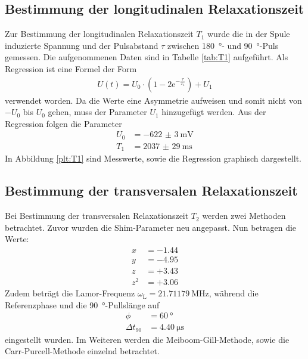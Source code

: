 \subsection{Bestimmung der longitudinalen Relaxationszeit}
Zur Bestimmung der longitudinalen Relaxationszeit $T_1$ wurde die in der
Spule induzierte Spannung und der Pulsabstand $\tau$ zwischen \SI{180}{\degree}-
und \SI{90}{\degree}-Puls gemessen. Die aufgenommenen Daten sind in Tabelle
\ref{tab:T1} aufgeführt.
%
\FloatBarrier
Als Regression ist eine Formel der Form
\begin{align*}
  U(t) = U_0 \cdot \left(1- 2\text{e}^{-\frac{\tau}{T_1}}\right) + U_1
\end{align*}
verwendet worden. Da die Werte eine Asymmetrie aufweisen und somit nicht von
$-U_0$ bis $U_0$ gehen, muss der Parameter $U_1$ hinzugefügt werden.
Aus der Regression folgen die Parameter
\begin{align*}
  U_0 &= -\SI{622(3)}{\milli\volt} \\
  T_1 &= \SI{2037(29)}{\milli\second}
\end{align*}
In Abbildung \ref{plt:T1} sind Messwerte, sowie die Regression graphisch dargestellt.


\subsection{Bestimmung der transversalen Relaxationszeit}
Bei Bestimmung der transversalen Relaxationszeit $T_2$ werden zwei Methoden
betrachtet. Zuvor wurden die Shim-Parameter neu angepasst. Nun betragen die Werte:
\begin{align*}
  x &= -\num{1.44} \\
  y &= -\num{4.95} \\
  z &= +\num{3.43} \\
  z^2 &= +\num{3.06}
\end{align*}
Zudem beträgt die Lamor-Frequenz $\omega_\text{L} = \SI{21.71179}{\mega\hertz}$, während die
Referenzphase und die \SI{90}{\degree}-Pullslänge auf
\begin{align*}
  \phi &= \SI{60}{\degree} \\
  \Delta t_{90} &= \SI{4.40}{\micro\second}
\end{align*}
eingestellt wurden.
Im Weiteren werden die Meiboom-Gill-Methode, sowie die Carr-Purcell-Methode
einzelnd betrachtet.

